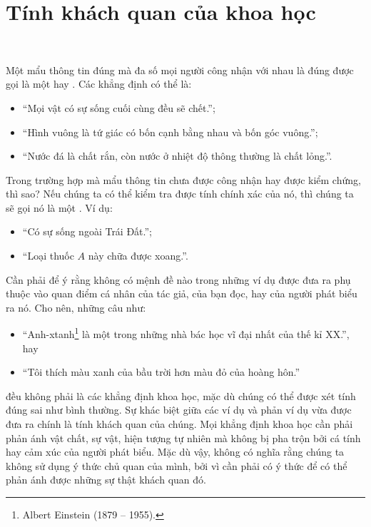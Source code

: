 \section{Tính khách quan của khoa học}

\

Một mẩu thông tin đúng mà đa số mọi người công nhận với nhau là đúng được gọi là một  hay . Các khẳng định có thể là:
\begin{itemize}
    \item ``Mọi vật có sự sống cuối cùng đều sẽ chết.'';
    \item ``Hình vuông là tứ giác có bốn cạnh bằng nhau và bốn góc vuông.'';
    \item ``Nước đá là chất rắn, còn nước ở nhiệt độ thông thường là chất lỏng.''.
\end{itemize}

Trong trường hợp mà mẩu thông tin chưa được công nhận hay được kiểm chứng, thì sao? Nếu chúng ta có thể kiểm tra được tính chính xác của nó, thì chúng ta sẽ gọi nó là một . Ví dụ:
\begin{itemize}
    \item ``Có sự sống ngoài Trái Đất.'';
    \item ``Loại thuốc $A$ này chữa được xoang.''.
\end{itemize}

Cần phải để ý rằng không có mệnh đề nào trong những ví dụ được đưa ra phụ thuộc vào quan điểm cá nhân của tác giả, của bạn đọc, hay của người phát biểu ra nó. Cho nên, những câu như:
\begin{itemize}
    \item ``Anh-xtanh\footnote{Albert Einstein (1879 -- 1955).} là một trong những nhà bác học vĩ đại nhất của thế kỉ XX.'', hay
    \item ``Tôi thích màu xanh của bầu trời hơn màu đỏ của hoàng hôn.''
\end{itemize}
đều không phải là các khẳng định khoa học, mặc dù chúng có thể được xét tính đúng sai như bình thường. Sự khác biệt giữa các ví dụ và phản ví dụ vừa được đưa ra chính là tính khách quan của chúng. Mọi khẳng định khoa học cần phải phản ánh vật chất, sự vật, hiện tượng tự nhiên mà không bị pha trộn bởi cá tính hay cảm xúc của người phát biểu. Mặc dù vậy, không có nghĩa rằng chúng ta không sử dụng ý thức chủ quan của mình, bởi vì cần phải có ý thức để có thể phản ánh được những sự thật khách quan đó.